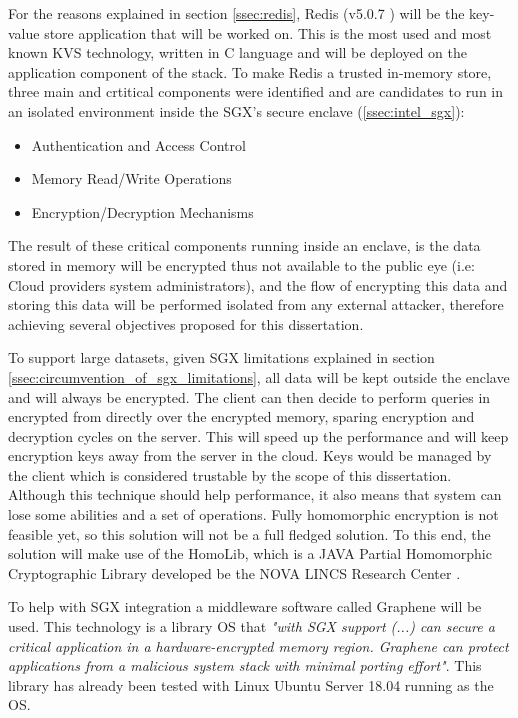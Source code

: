 For the reasons explained in section \ref{ssec:redis}, Redis (v5.0.7 \cite{redis:1}) will be the key-value store application that will be worked on. This is the most used and most known \gls{KVS} technology, written in C language and will be deployed on the application component of the stack. To make Redis a trusted in-memory store, three main and crtitical components were identified and are candidates to run in an isolated environment inside the \gls{SGX}'s secure enclave (\ref{ssec:intel_sgx}):

\begin{itemize}
	\item Authentication and Access Control
	\item Memory Read/Write Operations
	\item Encryption/Decryption Mechanisms
\end{itemize}

The result of these critical components running inside an enclave, is the data stored in memory will be encrypted thus not available to the public eye (i.e: Cloud providers system administrators), and the flow of encrypting this data and storing this data will be performed isolated from any external attacker, therefore achieving several objectives proposed for this dissertation.

To support large datasets, given \gls{SGX} limitations explained in section \ref{ssec:circumvention_of_sgx_limitations}, all data will be kept outside the enclave and will always be encrypted. The client can then decide to perform queries in encrypted from directly over the encrypted memory, sparing encryption and decryption cycles on the server. This will speed up the performance and will keep encryption keys away from the server in the cloud. Keys would be managed by the client which is considered trustable by the scope of this dissertation. Although this technique should help performance, it also means that system can lose some abilities and a set of operations. Fully homomorphic encryption is not feasible yet, so this solution will not be a full fledged solution. To this end, the solution will make use of the HomoLib, which is a JAVA Partial Homomorphic Cryptographic Library developed be the NOVA LINCS Research Center \cite{homolib:1}.

To help with \gls{SGX} integration a middleware software called Graphene \cite{graphene:1, graphene:2} will be used. This technology is a library \gls{OS} that \textit{"with \gls{SGX} support (...) can secure a critical application in a hardware-encrypted memory region. Graphene can protect applications from a malicious system stack with minimal porting effort"}. This library has already been tested with Linux Ubuntu Server 18.04 running as the \gls{OS}. 

